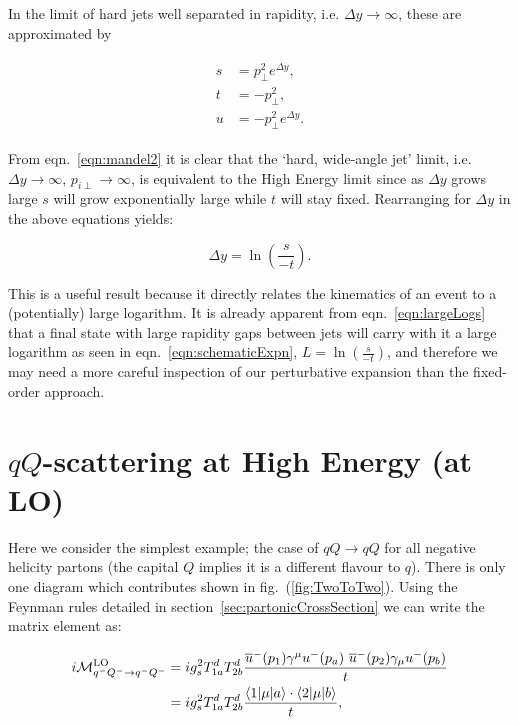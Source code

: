 	In the limit of hard jets well separated in rapidity, i.e. $\Delta y\rightarrow\infty$,
	these are approximated by

	\begin{align}
	\begin{split}
		s &= p_\perp^2 e^{\Delta y},\\
		t &= -p_\perp^2,\\
		u &= -p_\perp^2 e^{\Delta y}.
		\label{eqn:mandel2}
	\end{split}
	\end{align}

	From  eqn.~\eqref{eqn:mandel2} it is clear that the `hard, wide-angle jet' limit, i.e. $\Delta y\to\infty$,
	$p_{i\perp}\to\infty$, is equivalent to the High Energy limit since as $\Delta y$ grows large $s$ will
	grow exponentially large while $t$ will stay fixed.  Rearranging for $\Delta y$ in the above equations yields:

	\begin{equation}
		\Delta y = \ln \left(\frac{s}{-t}\right).
		\label{eqn:largeLogs}
	\end{equation}

	This is a useful result because it directly relates the kinematics of an event to a (potentially)
	large logarithm.  It is already apparent from eqn.~\eqref{eqn:largeLogs} that a final state
	with large rapidity gaps between jets will carry with it a large logarithm as seen in
	eqn.~\eqref{eqn:schematicExpn}, $L=\ln \left(\frac{s}{-t}\right)$, and therefore we may need a
	more careful inspection of our perturbative expansion than the fixed-order approach.

\section{$qQ$-scattering at High Energy (at LO)}
	\label{sec:qQScat}

	Here we consider the simplest example; the case of $qQ\rightarrow qQ$ for all negative helicity partons
	(the capital $Q$ implies it is a different flavour to $q$).  There is only one diagram which contributes shown
	in fig.~(\ref{fig:TwoToTwo}).  Using the Feynman rules detailed in section~\ref{sec:partonicCrossSection} we can
	write the matrix element as:

	\begin{align}
		i\mathcal{M}_{q^-Q^-\rightarrow q^-Q^-}^{\text{LO}} &= ig_s^2T^d_{1a}T^d_{2b}
		\frac{\overline{u}^-(p_1)\gamma^\mu
		  u^-(p_a)\text{ }\overline{u}^-(p_2)\gamma_\mu u^-(p_b)}{t}\\
		  &= ig_s^2T^d_{1a}T^d_{2b}\frac{\langle 1 | \mu | a \rangle\cdot\langle 2 | \mu | b \rangle}{t},
		  \label{eqn:similarBrackets}
	\end{align}

